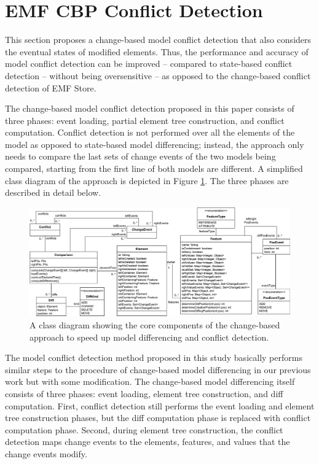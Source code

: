 \section{EMF CBP Conflict Detection}
\label{sec:emf_cbp_conflict_detection}
This section proposes a change-based model conflict detection that also considers the eventual states of modified elements. Thus, the performance and accuracy of model conflict detection can be improved -- compared to state-based conflict detection -- without being oversensitive -- as opposed to the change-based conflict detection of EMF Store.

The change-based model conflict detection proposed in this paper consists of three phases: event loading, partial element tree construction, and conflict computation. Conflict detection is not performed over all the elements of the model as opposed to state-based model differencing; instead, the approach only needs to compare the last sets of change events of the two models being compared, starting from the first line of both models are different. A simplified class diagram of the approach \cite{epsilonlabs2019emfcbp} is depicted in Figure \ref{fig:approach_class_diagram}. The three phases are described in detail below.

\begin{figure}
\includegraphics[width=\linewidth]{TreeClassDiagram}
\caption{A class diagram showing the core components of the change-based approach to speed up model differencing and conflict detection.}
\label{fig:approach_class_diagram}
\end{figure}

The model conflict detection method proposed in this study basically performs similar steps to the procedure of change-based model differencing in our previous work \cite{yohannis2019efficient} but with some modification. The change-based model differencing itself consists of three phases: event loading, element tree construction, and diff computation. First, conflict detection still performs the event loading and element tree construction phases, but the diff computation phase is replaced with conflict computation phase. Second, during element tree construction, the conflict detection maps change events to the elements, features, and values that the change events modify. 

